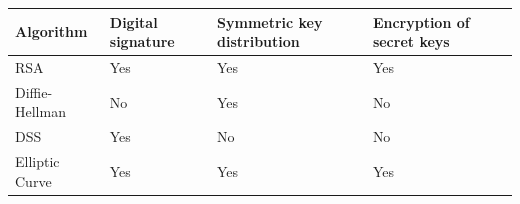 \documentclass{article}
\begin{document}
                                    \begin{table}[h]
                                        \begin{center}
                                            \begin{tabular}{| m{3cm} | m{3cm} | m{3cm} | m{3cm} |}
                                                \hline
                                                \textbf{Algorithm} & \textbf{Digital signature} & \textbf{Symmetric key distribution} & \textbf{Encryption of secret keys} \\
                                                \hline
                                                RSA & Yes & Yes & Yes \\
                                                \hline
                                                Diffie-Hellman & No & Yes & No \\
                                                \hline
                                                DSS & Yes & No & No \\
                                                \hline
                                                Elliptic Curve & Yes & Yes & Yes \\
                                                \hline
                                                \end{tabular}
                                        \end{center}
                                    \end{table}
\end{document}
